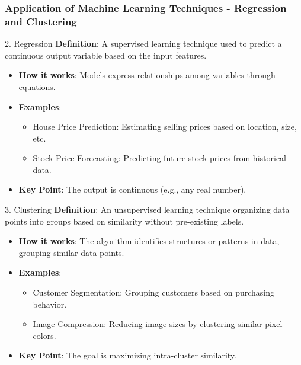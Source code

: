 \documentclass[aspectratio=169]{beamer}
\begin{document}
\begin{frame}[fragile]
    \frametitle{Application of Machine Learning Techniques - Regression and Clustering}
    \begin{block}{2. Regression}
        \textbf{Definition}: A supervised learning technique used to predict a continuous output variable based on the input features.
    \end{block}
    \begin{itemize}
        \item \textbf{How it works}: Models express relationships among variables through equations.
        \item \textbf{Examples}:
        \begin{itemize}
            \item House Price Prediction: Estimating selling prices based on location, size, etc.
            \item Stock Price Forecasting: Predicting future stock prices from historical data.
        \end{itemize}
        \item \textbf{Key Point}: The output is continuous (e.g., any real number).
    \end{itemize}
    
    \vspace{0.5cm} %

    \begin{block}{3. Clustering}
        \textbf{Definition}: An unsupervised learning technique organizing data points into groups based on similarity without pre-existing labels.
    \end{block}
    \begin{itemize}
        \item \textbf{How it works}: The algorithm identifies structures or patterns in data, grouping similar data points.
        \item \textbf{Examples}:
        \begin{itemize}
            \item Customer Segmentation: Grouping customers based on purchasing behavior.
            \item Image Compression: Reducing image sizes by clustering similar pixel colors.
        \end{itemize}
        \item \textbf{Key Point}: The goal is maximizing intra-cluster similarity.
    \end{itemize}
\end{frame}
\end{document}
